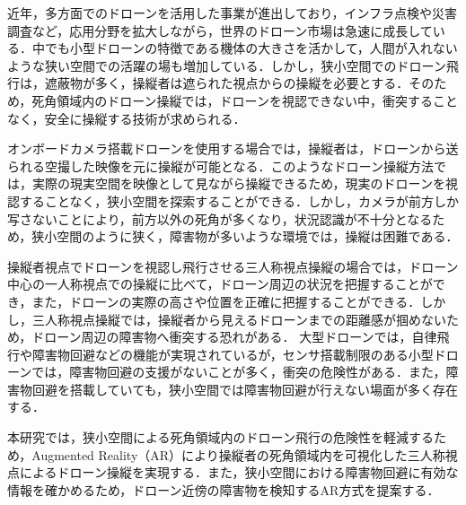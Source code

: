 \documentclass[submit,techrep]{ipsj}
\begin{document}
近年，多方面でのドローンを活用した事業が進出しており，インフラ点検や災害調査など，応用分野を拡大しながら，世界のドローン市場は急速に成長している\cite{Nonami}．中でも小型ドローンの特徴である機体の大きさを活かして，人間が入れないような狭い空間での活躍の場も増加している．しかし，狭小空間でのドローン飛行は，遮蔽物が多く，操縦者は遮られた視点からの操縦を必要とする．そのため，死角領域内のドローン操縦では，ドローンを視認できない中，衝突することなく，安全に操縦する技術が求められる．
\par
オンボードカメラ搭載ドローンを使用する場合では，操縦者は，ドローンから送られる空撮した映像を元に操縦が可能となる．このようなドローン操縦方法では，実際の現実空間を映像として見ながら操縦できるため，現実のドローンを視認することなく，狭小空間を探索することができる．しかし，カメラが前方しか写さないことにより，前方以外の死角が多くなり，状況認識が不十分となるため\cite{Green}，狭小空間のように狭く，障害物が多いような環境では，操縦は困難である．
\par
操縦者視点でドローンを視認し飛行させる三人称視点操縦の場合では，ドローン中心の一人称視点での操縦に比べて，ドローン周辺の状況を把握することができ，また，ドローンの実際の高さや位置を正確に把握することができる\cite{Green}．しかし，三人称視点操縦では，操縦者から見えるドローンまでの距離感が掴めないため\cite{Zollmann}，ドローン周辺の障害物へ衝突する恐れがある．
大型ドローンでは，自律飛行や障害物回避などの機能が実現されているが，センサ搭載制限のある小型ドローンでは，障害物回避の支援がないことが多く，衝突の危険性がある．また，障害物回避を搭載していても，狭小空間では障害物回避が行えない場面が多く存在する\cite{syohou}．
\par
本研究では，狭小空間による死角領域内のドローン飛行の危険性を軽減するため，Augmented Reality（AR）により操縦者の死角領域内を可視化した三人称視点によるドローン操縦を実現する．また，狭小空間における障害物回避に有効な情報を確かめるため，ドローン近傍の障害物を検知するAR方式を提案する．

\end{document}
